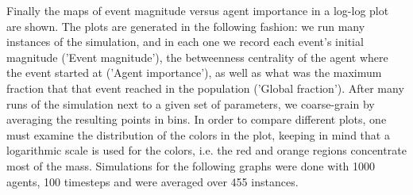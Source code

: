 \documentclass [12pt,a4paper,twoside]{article}
\begin{document}
Finally the maps of event magnitude versus agent importance in a log-log plot are shown. The plots are generated in the following fashion: we run many instances of the simulation, and in each one we record each event's initial magnitude ('Event magnitude'), the betweenness centrality of the agent where the event started at ('Agent importance'), as well as what was the maximum fraction that that event reached in the population ('Global fraction'). After many runs of the simulation next to a given set of parameters, we coarse-grain by averaging the resulting points in bins. In order to compare different plots, one must examine the distribution of the colors in the plot, keeping in mind that a logarithmic scale is used for the colors, i.e. the red and orange regions concentrate most of the mass. Simulations for the following graphs were done with 1000 agents, 100 timesteps and were averaged over 455 instances.
\end{document}

